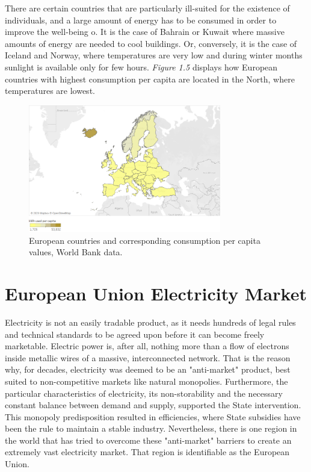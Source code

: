 \documentclass{book}
\begin{document}
There are certain countries that are particularly ill-suited for the existence of individuals, and a large amount of energy has to be consumed in order to improve the well-being o. It is the case of Bahrain or Kuwait where massive amounts of energy are needed to cool buildings. Or, conversely, it is the case of Iceland and Norway, where temperatures are very low and during winter months sunlight is available only for few hours. \textit{Figure 1.5} displays how European countries with highest consumption per capita are located in the North, where temperatures are lowest.

\bigskip
\begin{figure}[H]
\begin{center}
\captionsetup{justification=centering}
\includegraphics[width=0.75\textwidth]{Images/cons.png}
\caption{European countries and corresponding consumption per capita values, World Bank data. }
\end{center}
\end{figure}
\bigskip

\section{European Union Electricity Market}

Electricity is not an easily tradable product, as it needs hundreds of  legal rules and technical standards to be agreed upon before it can become freely marketable. Electric power is, after all, nothing more than a flow of electrons inside metallic wires of a massive, interconnected network. That is the reason why, for decades, electricity was deemed to be an "anti-market" product, best suited to non-competitive markets like natural monopolies. \cite{glachant2014eu} Furthermore, the particular characteristics of electricity, its non-storability and the necessary constant balance between demand and supply, supported the State intervention. This monopoly predisposition resulted in efficiencies, where State subsidies have been the rule to maintain a stable industry. \cite{domanico2007concentration} Nevertheless, there is one region in the world that has tried to overcome these "anti-market" barriers to create an extremely vast electricity market. That region is identifiable as the European Union. \\
\end{document}
